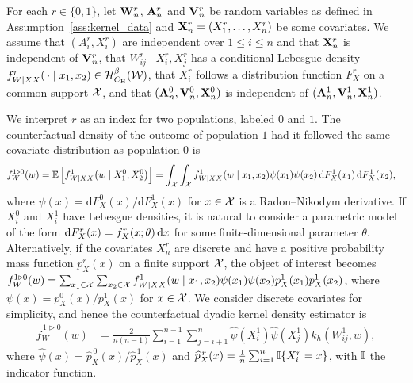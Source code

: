 For each $r \in \{0,1\}$,
let $\mathbf{W}_n^r$, $\mathbf{A}_n^r$ and $\mathbf{V}_n^r$ be random variables
as defined in Assumption~\ref{ass:kernel_data} and
$\mathbf{X}_n^r = (X_1^r, \ldots, X_n^r)$ be some covariates.
We assume that $(A_i^r, X_i^r)$ are
independent over $1 \leq i \leq n$
and that $\mathbf{X}_n^r$ is independent of $\mathbf{V}_n^r$,
that $W_{ij}^r \mid X_i^r, X_j^r$
has a conditional Lebesgue density
$f_{W \mid XX}^r(\,\cdot \mid x_1, x_2) \in \mathcal{H}^\beta_{C_\mathrm{H}}(\mathcal{W})$,
that $X_i^r$ follows a distribution function $F_X^r$
on a common support $\mathcal{X}$, and that
$(\mathbf{A}_n^0, \mathbf{V}_n^0, \mathbf{X}_n^0)$
is independent of $(\mathbf{A}_n^1, \mathbf{V}_n^1, \mathbf{X}_n^1)$.

We interpret $r$ as an index for two populations,
labeled $0$ and $1$.
The counterfactual density of the outcome of
population $1$ had it followed the same covariate distribution
as population $0$ is
%
\begin{align*}
  f_W^{1 \triangleright 0}(w)
  &=
  \mathbb{E}\left[
    f_{W \mid XX}^1\big(w \mid X_1^0, X_2^0\big)
  \right]
  = \int_{\mathcal{X}}
  \int_{\mathcal{X}}
  f_{W \mid XX}^{1}(w \mid x_1, x_2)
  \psi(x_1)
  \psi(x_2)
  \,\mathrm{d}F_X^{1}(x_1)
  \,\mathrm{d}F_X^{1}(x_2),
\end{align*}
%
where $\psi(x) = \mathrm{d} F_X^0(x) / \mathrm{d} F_X^1(x)$ for $x \in \mathcal{X}$
is a Radon--Nikodym derivative.
If $X^0_i$ and $X^1_i$ have Lebesgue densities,
it is natural to consider a parametric model of the form
$\mathrm{d} F_X^{r}(x)=f_X^r(x;\theta)\,\mathrm{d}x$
for some finite-dimensional parameter $\theta$.
Alternatively, if the covariates $X_n^r$ are discrete and have a positive
probability mass function $p_X^r(x)$ on a finite
support $\mathcal{X}$, the object of interest becomes
$f_W^{1 \triangleright 0}(w)
= \sum_{x_1 \in \mathcal{X}} \sum_{x_2 \in \mathcal{X}}
f_{W \mid XX}^{1}(w \mid x_1, x_2) \psi(x_1) \psi(x_2)
p_X^{1}(x_1) p_X^{1}(x_2)$,
where $\psi(x) = p_X^0(x)/p_X^1(x)$ for $x \in \mathcal{X}$.
We consider discrete covariates for simplicity,
and hence the counterfactual dyadic kernel density estimator is
%
\begin{align*}
  \widehat f_W^{\,1 \triangleright 0}(w)
  &=
  \frac{2}{n(n-1)}
  \sum_{i=1}^{n-1}
  \sum_{j=i+1}^n
  \widehat \psi(X_i^1)
  \widehat \psi(X_j^1)
  k_h(W_{ij}^1, w),
\end{align*}
%
where $\widehat\psi(x) = \widehat p_X^{\,0}(x) / \widehat p_X^{\,1}(x)$ and
$\widehat p_X^{\,r}(x) = \frac{1}{n}\sum_{i = 1}^n \mathbb{I}\{X_i^r = x\}$,
with $\mathbb{I}$ the indicator function.

